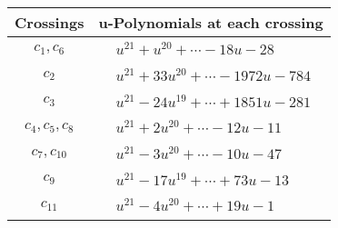 \documentclass[1p]{elsarticle_modified}
\theoremstyle{definition}
\begin{document}
\begin{tabular}{m{50pt}|m{274pt}}
Crossings & \hspace{64pt}u-Polynomials at each crossing \\
\hline $$\begin{aligned}c_{1},c_{6}\end{aligned}$$&$\begin{aligned}
&u^{21}+u^{20}+\cdots-18 u-28
\end{aligned}$\\
\hline $$\begin{aligned}c_{2}\end{aligned}$$&$\begin{aligned}
&u^{21}+33 u^{20}+\cdots-1972 u-784
\end{aligned}$\\
\hline $$\begin{aligned}c_{3}\end{aligned}$$&$\begin{aligned}
&u^{21}-24 u^{19}+\cdots+1851 u-281
\end{aligned}$\\
\hline $$\begin{aligned}c_{4},c_{5},c_{8}\end{aligned}$$&$\begin{aligned}
&u^{21}+2 u^{20}+\cdots-12 u-11
\end{aligned}$\\
\hline $$\begin{aligned}c_{7},c_{10}\end{aligned}$$&$\begin{aligned}
&u^{21}-3 u^{20}+\cdots-10 u-47
\end{aligned}$\\
\hline $$\begin{aligned}c_{9}\end{aligned}$$&$\begin{aligned}
&u^{21}-17 u^{19}+\cdots+73 u-13
\end{aligned}$\\
\hline $$\begin{aligned}c_{11}\end{aligned}$$&$\begin{aligned}
&u^{21}-4 u^{20}+\cdots+19 u-1
\end{aligned}$\\
\hline
\end{tabular}\\~\\
\newpage\renewcommand{\arraystretch}{1}
\end{document}
